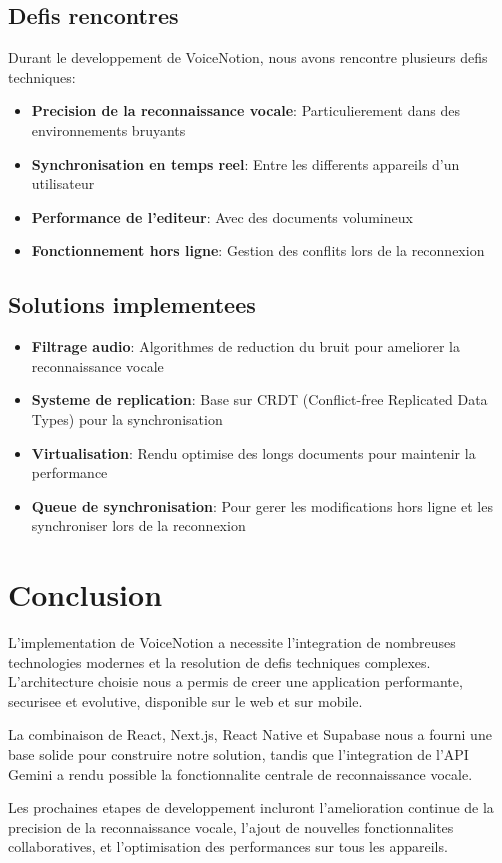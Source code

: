 \subsection{Defis rencontres}
Durant le developpement de VoiceNotion, nous avons rencontre plusieurs defis techniques:
\begin{itemize}
    \item \textbf{Precision de la reconnaissance vocale}: Particulierement dans des environnements bruyants
    \item \textbf{Synchronisation en temps reel}: Entre les differents appareils d'un utilisateur
    \item \textbf{Performance de l'editeur}: Avec des documents volumineux
    \item \textbf{Fonctionnement hors ligne}: Gestion des conflits lors de la reconnexion
\end{itemize}

\subsection{Solutions implementees}
\begin{itemize}
    \item \textbf{Filtrage audio}: Algorithmes de reduction du bruit pour ameliorer la reconnaissance vocale
    \item \textbf{Systeme de replication}: Base sur CRDT (Conflict-free Replicated Data Types) pour la synchronisation
    \item \textbf{Virtualisation}: Rendu optimise des longs documents pour maintenir la performance
    \item \textbf{Queue de synchronisation}: Pour gerer les modifications hors ligne et les synchroniser lors de la reconnexion
\end{itemize}

\section{Conclusion}
L'implementation de VoiceNotion a necessite l'integration de nombreuses technologies modernes et la resolution de defis techniques complexes. L'architecture choisie nous a permis de creer une application performante, securisee et evolutive, disponible sur le web et sur mobile.

La combinaison de React, Next.js, React Native et Supabase nous a fourni une base solide pour construire notre solution, tandis que l'integration de l'API Gemini a rendu possible la fonctionnalite centrale de reconnaissance vocale.

Les prochaines etapes de developpement incluront l'amelioration continue de la precision de la reconnaissance vocale, l'ajout de nouvelles fonctionnalites collaboratives, et l'optimisation des performances sur tous les appareils. 